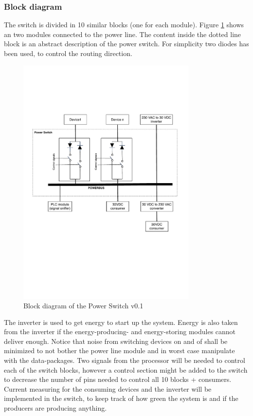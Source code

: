 \subsubsection{Block diagram}
The switch is divided in 10 similar blocks (one for each module). Figure \ref{fig:ps_block_v0_1} shows an two modules connected to the power line. The content inside the dotted line block is an abstract description of the power switch. For simplicity two diodes has been used, to control the routing direction.
\begin{figure}[H]
	\begin{centering}
		\includegraphics[width=0.8\textwidth,page=1,angle=0]{images/power_switch_block_diagram_v0_1}
		\caption{Block diagram of the Power Switch v0.1}
		\label{fig:ps_block_v0_1}
	\end{centering}
\end{figure}
The inverter is used to get energy to start up the system. Energy is also taken from the inverter if the energy-producing- and energy-storing modules cannot deliver enough. 
\p Notice that noise from switching devices on and of shall be minimized to not bother the power line module and in worst case manipulate with the data-packages. 
\p Two signals from the processor will be needed to control each of the switch blocks, however a control section might be added to the switch to decrease the number of pins needed to control all 10 blocks + consumers. 
\p Current measuring for the consuming devices and the inverter will be implemented in the switch, to keep track of how green the system is and if the producers are producing anything.  
